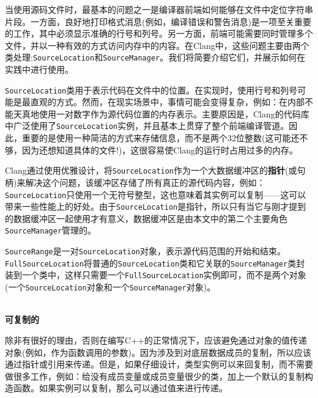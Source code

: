 当使用源码文件时，最基本的问题之一是编译器前端如何能够在文件中定位字符串片段。一方面，良好地打印格式消息(例如，编译错误和警告消息)是一项至关重要的工作，其中必须显示准确的行号和列号。另一方面，前端可能需要同时管理多个文件，并以一种有效的方式访问内存中的内容。在Clang中，这些问题主要由两个类处理:\texttt{SourceLocation}和\texttt{SourceManager}。我们将简要介绍它们，并展示如何在实践中进行使用。


\texttt{SourceLocation}类用于表示代码在文件中的位置。在实现时，使用行号和列号可能是最直观的方式。然而，在现实场景中，事情可能会变得复杂，例如：在内部不能天真地使用一对数字作为源代码位置的内存表示。主要原因是，Clang的代码库中广泛使用了\texttt{SourceLocation}实例，并且基本上贯穿了整个前端编译管道。因此，重要的是使用一种简洁的方式来存储信息，而不是两个32位整数(这可能还不够，因为还想知道具体的文件!)，这很容易使Clang的运行时占用过多的内存。

Clang通过使用优雅设计，将\texttt{SourceLocation}作为一个大数据缓冲区的\textbf{指针}(或句柄)来解决这个问题，该缓冲区存储了所有真正的源代码内容，例如：\texttt{SourceLocation}只使用一个无符号整型，这也意味着其实例可以复制——这可以带来一些性能上的好处。由于\texttt{SourceLocation}是指针，所以只有当它与刚才提到的数据缓冲区一起使用才有意义，数据缓冲区是由本文中的第二个主要角色\texttt{SourceManager}管理的。

\begin{tcolorbox}[colback=blue!5!white,colframe=blue!75!black, fonttitle=\bfseries,title=其他实用工具]
\hspace*{0.7cm}\texttt{SourceRange}是一对\texttt{SourceLocation}对象，表示源代码范围的开始和结束。\texttt{FullSourceLocation}将普通的\texttt{SourceLocation}类和它关联的\texttt{SourceManager}类封装到一个类中，这样只需要一个\texttt{FullSourceLocation}实例即可，而不是两个对象(一个\texttt{SourceLocation}对象和一个\texttt{SourceManager}对象)。
\end{tcolorbox}

\hspace*{\fill} \\ %
\noindent
\textbf{可复制的}

除非有很好的理由，否则在编写C++的正常情况下，应该避免通过对象的值传递对象(例如，作为函数调用的参数)。因为涉及到对底层数据成员的复制，所以应该通过指针或引用来传递。但是，如果仔细设计，类型实例可以来回复制，而不需要做很多工作，例如：给没有成员变量或成员变量很少的类，加上一个默认的复制构造函数。如果实例可以复制，那么可以通过值来进行传递。

